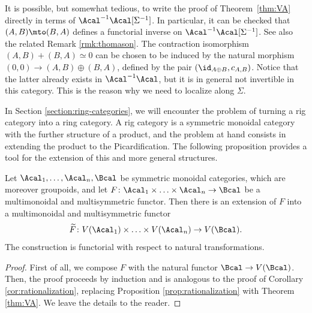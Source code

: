 \begin{remark}\label{rmk:thomason-strict}
It is possible, but somewhat tedious, to write the proof of Theorem~\ref{thm:VA} directly in terms of $\Acal^{-1}\Acal[\Sigma^{-1}]$. In particular, it can be checked that \hbox{$(A,B)\mto (B,A)$} defines a functorial inverse on $\Acal^{-1}\Acal[\Sigma^{-1}]$. See also the related Remark \ref{rmk:thomason}. The contraction isomorphism $(A,B)+(B,A)\simeq 0$ can be chosen to be induced by the natural morphism $(0,0)\to (A,B)\oplus (B,A)$, defined by the pair $(\id_{A\oplus B}, c_{A,B})$. Notice that the latter already exists in $\Acal^{-1}\Acal$, but it is in general not invertible in this category. This is the reason why we need to localize along $\Sigma$.

\end{remark}

In Section \ref{section:ring-categories}, we will encounter the problem of turning a rig category into a ring category. A rig category is a symmetric monoidal category with the further structure of a product, and the problem at hand consists in extending the product to the Picardification. The following proposition provides a tool for the extension of this and more general structures.

\begin{proposition}\label{prop:product}
Let $\Acal_{1},\ldots,\Acal_{n},\Bcal$ be symmetric monoidal categories, which are moreover groupoids, and let $F\colon \Acal_{1}\times\ldots\times\Acal_{n}\to\Bcal$ be a multimonoidal and multisymmetric functor. Then there is an extension of $F$ into a multimonoidal and multisymmetric functor
\begin{displaymath}
\widetilde{F}\colon V(\Acal_{1})\times\ldots \times V(\Acal_{n})\to V(\Bcal).
\end{displaymath}
The construction is functorial with respect to natural transformations.
\end{proposition}
\begin{proof}
First of all, we compose $F$ with the natural functor $\Bcal\to V(\Bcal)$. Then, the proof proceeds by induction and is analogous to the proof of Corollary \ref{cor:rationalization}, replacing Proposition \ref{prop:rationalization} with Theorem \ref{thm:VA}. We leave the details to the reader.
\end{proof}

